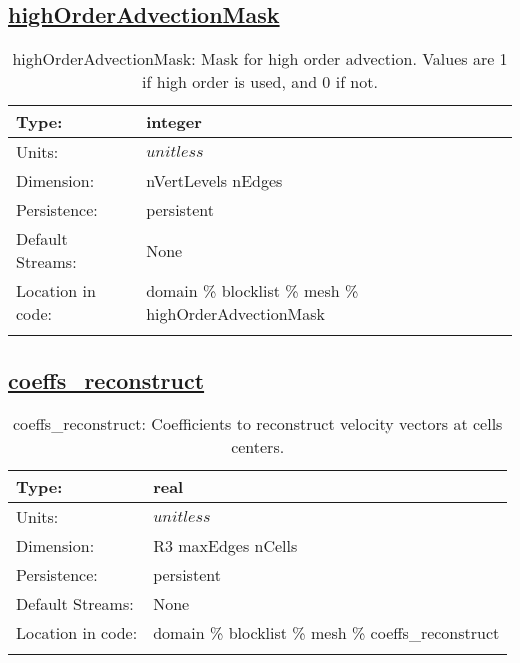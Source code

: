 \subsection[highOrderAdvectionMask]{\hyperref[sec:var_tab_mesh]{highOrderAdvectionMask}}
\label{subsec:var_sec_mesh_highOrderAdvectionMask}
\begin{center}
\begin{longtable}{| p{2.0in} | p{4.0in} |}
        \hline 
        Type: & integer \\
        \hline 
        Units: & $unitless$ \\
        \hline 
        Dimension: & nVertLevels nEdges \\
        \hline 
        Persistence: & persistent \\
        \hline 
		 Default Streams: & None \\
        \hline 
		 Location in code: & domain \% blocklist \% mesh \% highOrderAdvectionMask \\
		 \hline 
    \caption{highOrderAdvectionMask: Mask for high order advection. Values are 1 if high order is used, and 0 if not.}
\end{longtable}
\end{center}
\subsection[coeffs\_reconstruct]{\hyperref[sec:var_tab_mesh]{coeffs\_reconstruct}}
\label{subsec:var_sec_mesh_coeffs_reconstruct}
\begin{center}
\begin{longtable}{| p{2.0in} | p{4.0in} |}
        \hline 
        Type: & real \\
        \hline 
        Units: & $unitless$ \\
        \hline 
        Dimension: & R3 maxEdges nCells \\
        \hline 
        Persistence: & persistent \\
        \hline 
		 Default Streams: & None \\
        \hline 
		 Location in code: & domain \% blocklist \% mesh \% coeffs\_reconstruct \\
		 \hline 
    \caption{coeffs\_reconstruct: Coefficients to reconstruct velocity vectors at cells centers.}
\end{longtable}
\end{center}
